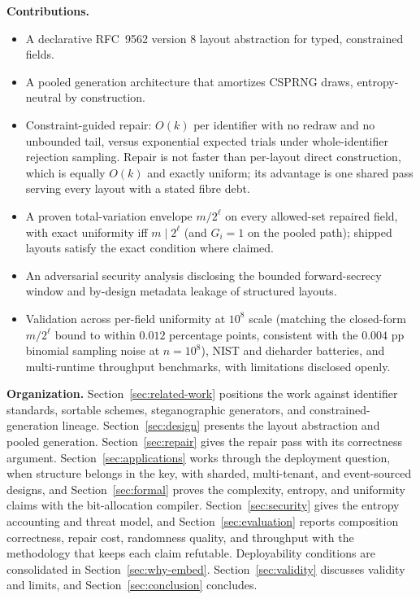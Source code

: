 \documentclass{svproc}
\begin{document}
\noindent\textbf{Contributions.}
\begin{itemize}
    \item A declarative RFC~9562 version 8 layout abstraction for typed, constrained fields.
    \item A pooled generation architecture that amortizes CSPRNG draws, entropy-neutral by construction.
    \item Constraint-guided repair: $O(k)$ per identifier with no redraw and no unbounded tail, versus exponential expected trials under whole-identifier rejection sampling. Repair is not faster than per-layout direct construction, which is equally $O(k)$ and exactly uniform; its advantage is one shared pass serving every layout with a stated fibre debt.
    \item A proven total-variation envelope $m/2^\ell$ on every allowed-set repaired field, with exact uniformity iff $m \mid 2^\ell$ (and $G_i=1$ on the pooled path); shipped layouts satisfy the exact condition where claimed.
    \item An adversarial security analysis disclosing the bounded forward-secrecy window and by-design metadata leakage of structured layouts.
    \item Validation across per-field uniformity at $10^8$ scale (matching the closed-form $m/2^\ell$ bound to within $0.012$ percentage points, consistent with the $0.004$ pp binomial sampling noise at $n=10^8$), NIST and dieharder batteries, and multi-runtime throughput benchmarks, with limitations disclosed openly.
\end{itemize}

\noindent\textbf{Organization.} Section~\ref{sec:related-work} positions the work against identifier standards, sortable schemes, steganographic generators, and constrained-generation lineage. Section~\ref{sec:design} presents the layout abstraction and pooled generation. Section~\ref{sec:repair} gives the repair pass with its correctness argument. Section~\ref{sec:applications} works through the deployment question, when structure belongs in the key, with sharded, multi-tenant, and event-sourced designs, and Section~\ref{sec:formal} proves the complexity, entropy, and uniformity claims with the bit-allocation compiler. Section~\ref{sec:security} gives the entropy accounting and threat model, and Section~\ref{sec:evaluation} reports composition correctness, repair cost, randomness quality, and throughput with the methodology that keeps each claim refutable. Deployability conditions are consolidated in Section~\ref{sec:why-embed}. Section~\ref{sec:validity} discusses validity and limits, and Section~\ref{sec:conclusion} concludes.
\end{document}
